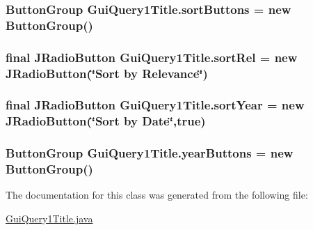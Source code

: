\subsubsection[{\texorpdfstring{sort\+Buttons}{sortButtons}}]{\setlength{\rightskip}{0pt plus 5cm}Button\+Group Gui\+Query1\+Title.\+sort\+Buttons = new Button\+Group()\hspace{0.3cm}{\ttfamily [private]}}\hypertarget{classGuiQuery1Title_a92ce684b789aae7c807f5041ac8f7b54}{}\label{classGuiQuery1Title_a92ce684b789aae7c807f5041ac8f7b54}
\subsubsection[{\texorpdfstring{sort\+Rel}{sortRel}}]{\setlength{\rightskip}{0pt plus 5cm}final J\+Radio\+Button Gui\+Query1\+Title.\+sort\+Rel = new J\+Radio\+Button(\char`\"{}Sort by Relevance\char`\"{})\hspace{0.3cm}{\ttfamily [private]}}\hypertarget{classGuiQuery1Title_aff3f4abd05828888c376d91e9c72ae3f}{}\label{classGuiQuery1Title_aff3f4abd05828888c376d91e9c72ae3f}
\subsubsection[{\texorpdfstring{sort\+Year}{sortYear}}]{\setlength{\rightskip}{0pt plus 5cm}final J\+Radio\+Button Gui\+Query1\+Title.\+sort\+Year = new J\+Radio\+Button(\char`\"{}Sort by Date\char`\"{},true)\hspace{0.3cm}{\ttfamily [private]}}\hypertarget{classGuiQuery1Title_a282ba6983218ab020c0fe9b65a0c5619}{}\label{classGuiQuery1Title_a282ba6983218ab020c0fe9b65a0c5619}
\subsubsection[{\texorpdfstring{year\+Buttons}{yearButtons}}]{\setlength{\rightskip}{0pt plus 5cm}Button\+Group Gui\+Query1\+Title.\+year\+Buttons = new Button\+Group()\hspace{0.3cm}{\ttfamily [private]}}\hypertarget{classGuiQuery1Title_ac28a3c0196f225f9048778b102a57663}{}\label{classGuiQuery1Title_ac28a3c0196f225f9048778b102a57663}


The documentation for this class was generated from the following file\+:\begin{DoxyCompactItemize}
\item 
\hyperlink{GuiQuery1Title_8java}{Gui\+Query1\+Title.\+java}\end{DoxyCompactItemize}
